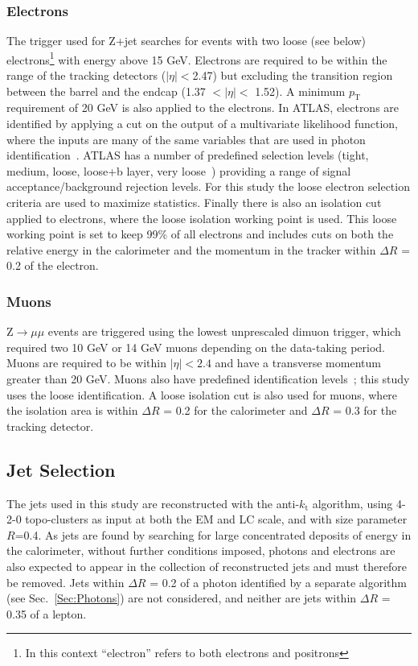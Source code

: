 \subsubsection{Electrons}
The trigger used for Z+jet searches for events with two loose (see below) electrons\footnote{In this context ``electron'' refers to both electrons and positrons} with energy above 15 GeV.  
Electrons are required to be within the range of the tracking detectors ($\mid\eta\mid<$2.47) but excluding the transition region between the barrel and the endcap (1.37 $<\mid\eta\mid<$ 1.52).  
A minimum $p_{\mathrm T}$ requirement of 20 GeV is also applied to the electrons.  
In ATLAS, electrons are identified by applying a cut on the output of a multivariate likelihood function, where the inputs are many of the same variables that are used in photon identification~\cite{ATL-PHYS-PUB-2015-041}.  
ATLAS has a number of predefined selection levels (tight, medium, loose, loose+b layer, very loose~\cite{ATL-PHYS-PUB-2015-041}) providing a range of signal acceptance/background rejection levels.  
For this study the loose electron selection criteria are used to maximize statistics.  
Finally there is also an isolation cut applied to electrons, where the loose isolation working point is used.  
This loose working point is set to keep 99\% of all electrons and includes cuts on both the relative energy in the calorimeter and the momentum in the tracker within $\Delta R$ = 0.2 of the electron.  


\subsubsection{Muons}
Z$\rightarrow\mu\mu$ events are triggered using the lowest unprescaled dimuon trigger, which required two 10 GeV or 14 GeV muons depending on the data-taking period.   
Muons are required to be within ${\mid\eta\mid<2.4}$ and have a transverse momentum greater than 20 GeV.  
Muons also have predefined identification levels~\cite{ATL-PHYS-PUB-2015-037}; this study uses the loose identification.  
A loose isolation cut is also used for muons, where the isolation area is within $\Delta R$ = 0.2 for the calorimeter and $\Delta R$ = 0.3 for the tracking detector.  

\subsection{Jet Selection}
The jets used in this study are reconstructed with the anti-$k_{\mathrm t}$ algorithm, using 4-2-0 topo-clusters as input at both the EM and LC scale, and with size parameter $R$=0.4.  
As jets are found by searching for large concentrated deposits of energy in the calorimeter, without further conditions imposed, photons and electrons are also expected to appear in the collection of reconstructed jets and must therefore be removed.  
Jets within $\Delta R$ = 0.2 of a photon identified by a separate algorithm (see Sec.~\ref{Sec:Photons}) are not considered, and neither are jets within $\Delta R$ = 0.35 of a lepton.  

